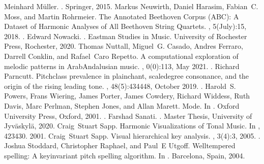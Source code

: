 \documentclass[letterpaper,10pt,english]{sphinxmanual}
\begin{document}
\begin{sphinxthebibliography}{10}
Meinhard Müller. . Springer, 2015.
Markus Neuwirth, Daniel Harasim, Fabian C. Moss, and Martin Rohrmeier. The Annotated Beethoven Corpus (ABC): A Dataset of Harmonic Analyses of All Beethoven String Quartets. , 5(July):1\textendash{}5, 2018. .
Edward Nowacki. . Eastman Studies in Music. University of Rochester Press, Rochester, 2020.
Thomas Nuttall, Miguel G. Casado, Andres Ferraro, Darrell Conklin, and Rafael Caro Repetto. A computational exploration of melodic patterns in Arab\sphinxhyphen{}Andalusian music. , 0(0):1\textendash{}13, May 2021. .
Richard Parncutt. Pitch\sphinxhyphen{}class prevalence in plainchant, scale\sphinxhyphen{}degree consonance, and the origin of the rising leading tone. , 48(5):434\textendash{}448, October 2019. .
Harold S. Powers, Frans Wiering, James Porter, James Cowdery, Richard Widdess, Ruth Davis, Marc Perlman, Stephen Jones, and Allan Marett. Mode. In . Oxford University Press, Oxford, 2001. .
Farshad Sanati. . Master Thesis, University of Jyväskylä, 2020.
Craig Stuart Sapp. Harmonic Visualizations of Tonal Music. In , 423\textendash{}430. 2001.
Craig Stuart Sapp. Visual hierarchical key analysis. , 3(4):3, 2005. .
Joshua Stoddard, Christopher Raphael, and Paul E Utgoff. Well\sphinxhyphen{}tempered spelling: A key\sphinxhyphen{}invariant pitch spelling algorithm. In . Barcelona, Spain, 2004.

\end{sphinxthebibliography}
\end{document}
